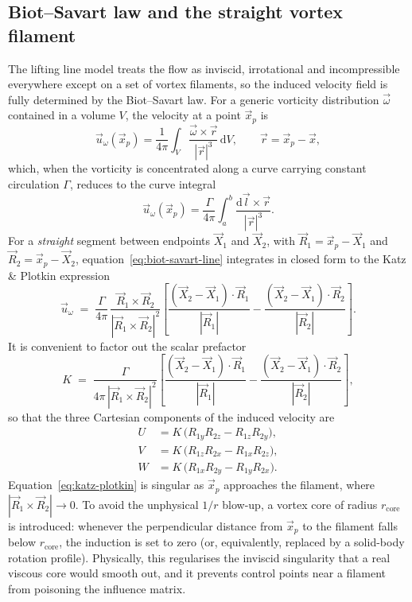 \subsection{Biot--Savart law and the straight vortex filament}
\label{sec:biot-savart}

The lifting line model treats the flow as inviscid, irrotational and incompressible everywhere except on a set of vortex filaments, so the induced velocity field is fully determined by the Biot--Savart law. For a generic vorticity distribution $\vec{\omega}$ contained in a volume $V$, the velocity at a point $\vec{x}_p$ is
\begin{equation}
\vec{u}_\omega(\vec{x}_p) = \frac{1}{4\pi}\int_V \frac{\vec{\omega}\times\vec{r}}{|\vec{r}|^3}\,\mathrm{d}V,
\qquad \vec{r}=\vec{x}_p-\vec{x},
\label{eq:biot-savart-volume}
\end{equation}
which, when the vorticity is concentrated along a curve carrying constant circulation $\Gamma$, reduces to the curve integral
\begin{equation}
\vec{u}_\omega(\vec{x}_p) = \frac{\Gamma}{4\pi}\int_a^b \frac{\mathrm{d}\vec{l}\times\vec{r}}{|\vec{r}|^3}.
\label{eq:biot-savart-line}
\end{equation}
For a \emph{straight} segment between endpoints $\vec{X}_1$ and $\vec{X}_2$, with $\vec{R}_1=\vec{x}_p-\vec{X}_1$ and $\vec{R}_2=\vec{x}_p-\vec{X}_2$, equation~\eqref{eq:biot-savart-line} integrates in closed form to the Katz \& Plotkin expression
\begin{equation}
\vec{u}_\omega \;=\; \frac{\Gamma}{4\pi}\,\frac{\vec{R}_1\times\vec{R}_2}{|\vec{R}_1\times\vec{R}_2|^2}
\left[\frac{(\vec{X}_2-\vec{X}_1)\!\cdot\!\vec{R}_1}{|\vec{R}_1|}
-\frac{(\vec{X}_2-\vec{X}_1)\!\cdot\!\vec{R}_2}{|\vec{R}_2|}\right].
\label{eq:katz-plotkin}
\end{equation}
It is convenient to factor out the scalar prefactor
\begin{equation}
K \;=\; \frac{\Gamma}{4\pi\,|\vec{R}_1\times\vec{R}_2|^2}
\left[\frac{(\vec{X}_2-\vec{X}_1)\!\cdot\!\vec{R}_1}{|\vec{R}_1|}
-\frac{(\vec{X}_2-\vec{X}_1)\!\cdot\!\vec{R}_2}{|\vec{R}_2|}\right],
\label{eq:K-scalar}
\end{equation}
so that the three Cartesian components of the induced velocity are
\begin{align}
U &= K\,\bigl(R_{1y}R_{2z}-R_{1z}R_{2y}\bigr), \nonumber\\
V &= K\,\bigl(R_{1z}R_{2x}-R_{1x}R_{2z}\bigr), \label{eq:UVW-components}\\
W &= K\,\bigl(R_{1x}R_{2y}-R_{1y}R_{2x}\bigr). \nonumber
\end{align}
Equation~\eqref{eq:katz-plotkin} is singular as $\vec{x}_p$ approaches the filament, where $|\vec{R}_1\times\vec{R}_2|\to 0$. To avoid the unphysical $1/r$ blow-up, a vortex core of radius $r_{\text{core}}$ is introduced: whenever the perpendicular distance from $\vec{x}_p$ to the filament falls below $r_{\text{core}}$, the induction is set to zero (or, equivalently, replaced by a solid-body rotation profile). Physically, this regularises the inviscid singularity that a real viscous core would smooth out, and it prevents control points near a filament from poisoning the influence matrix.

